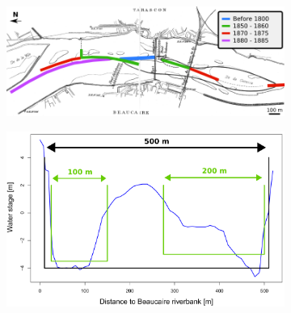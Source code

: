 \documentclass[11pt]{article}
\begin{document}
        \begin{figure}[h!]
            \centering
            \begin{subfigure}{0.7\linewidth}
            \centering
            \includegraphics[width=1\linewidth]{Figs/3a-DiguesArmand.png}\hfill
            \caption{}
            \label{subfig:diguesarmand}
            \end{subfigure}
            
            \begin{subfigure}{0.6\linewidth}
            \centering
            \includegraphics[width=1\linewidth]{Figs/3b-MatrixChenal_EN.png}
            \caption{}
            \label{subfig:matrixCh}
            \end{subfigure}
            

\end{figure}
\end{document}
